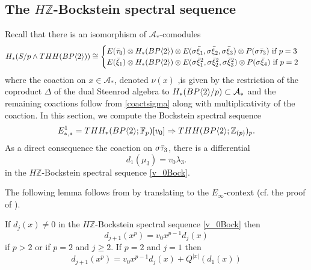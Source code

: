 
\subsection{The $H\mathbb{Z}$-Bockstein spectral sequence}
Recall that there is an isomorphism of $\mathcal{A}_*$-comodules
\[
H_*(S/p\wedge THH(BP\langle 2 \rangle)) \cong 
	\begin{cases} 
		E(\bar{\tau}_0)\otimes H_*(BP\langle 2 \rangle)\otimes E(\sigma \bar{\xi}_1,\sigma \bar{\xi}_2,\sigma \bar{\xi}_3)\otimes P(\sigma \bar{\tau}_3) \text{ if } p=3 \\
		E(\bar{\xi}_1)\otimes H_*(BP\langle 2 \rangle)\otimes E(\sigma \bar{\xi}_1^2,\sigma \bar{\xi}_2^2,\sigma \bar{\xi}_3^2)\otimes P(\sigma \bar{\xi}_4) \text{ if }p=2 
	\end{cases} 
\]
where the coaction on $x\in \mathcal{A}_*$, denoted $\nu(x)$ ,is given by the restriction of the coproduct $\Delta$ of the dual Steenrod algebra to $H_*(BP\langle 2 \rangle/p)\subset \mathcal{A}_*$ and the remaining coactions follow from \eqref{coactsigma} along with multiplicativity of the coaction.
In this section, we compute the Bockstein spectral sequence
\begin{equation}\label{v_0Bock} 
E^1_{*,*}=THH_*(BP\langle 2 \rangle;\mathbb{F}_p)[v_0]\Rightarrow THH(BP\langle 2 \rangle;\mathbb{Z}_{(p)})_p.
\end{equation}
As a direct consequence the coaction on  $\sigma \bar{\tau}_3$, there is a differential
\begin{equation}
d_1(\mu_3) = v_0\lambda_3. 
\end{equation}
in the $H\mathbb{Z}$-Bockstein spectral sequence \eqref{v_0Bock}.

The following lemma follows from \cite[Prop. 6.8]{May70} by translating to the $E_{\infty}$-context (cf. the proof of \cite[Lem. 3.2]{AHL}). 
\begin{lem}
	If $d_j(x)\ne 0$ in the $H\mathbb{Z}$-Bockstein spectral sequence \eqref{v_0Bock} then 
	\[
	d_{j+1}(x^p) = v_0x^{p-1}d_j(x)
	\]
	if $p>2$ or if $p=2$ and $j\geq 2$. If $p=2$ and $j=1$ then 
	\[
	d_{j+1}(x^p) = v_0x^{p-1}d_j(x)+Q^{|x|}(d_1(x))
	\]
\end{lem}

